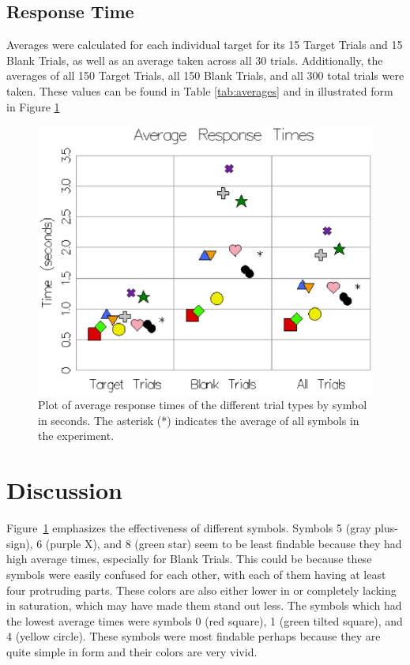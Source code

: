 \documentclass{article} %
\begin{document}
\subsection{Response Time}

Averages were calculated for each individual target for its 15 Target Trials and 15 Blank Trials, as well as an average taken across all 30 trials.  Additionally, the averages of all 150 Target Trials, all 150 Blank Trials, and all 300 total trials were taken.  These values can be found in Table \ref{tab:averages} and in illustrated form in Figure \ref{fig:averages}

\begin{figure}[htb]
	\includegraphics[width=12cm]{images/average-response-times.eps}
	\caption{Plot of average response times of the different trial types by symbol in seconds.  The asterisk (*) indicates the average of all symbols in the experiment.}
	\label{fig:averages}
\end{figure}

\section{Discussion}

Figure~\ref{fig:averages} emphasizes the effectiveness of different symbols.  Symbols 5 (gray plus-sign), 6 (purple X), and 8 (green star) seem to be least findable because they had high average times, especially for Blank Trials.  This could be because these symbols were easily confused for each other, with each of them having at least four protruding parts.  These colors are also either lower in or completely lacking in saturation, which may have made them stand out less.  The symbols which had the lowest average times were symbols 0 (red square), 1 (green tilted square), and 4 (yellow circle).  These symbols were most findable perhaps because they are quite simple in form and their colors are very vivid.
\end{document}
